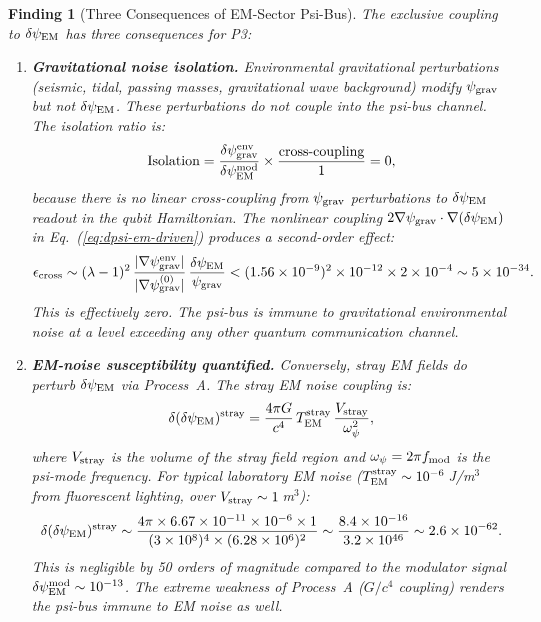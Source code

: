 \documentclass[11pt]{article}
\newtheorem{finding}[theorem]{Finding}
\theoremstyle{definition}
\theoremstyle{remark}
\newcommand{\ee}[1]{\times 10^{#1}}
\newcommand{\psigrav}{\psi_{\rm grav}}
\newcommand{\dpsiEM}{\delta\psi_{\rm EM}}
\begin{document}
\begin{finding}[Three Consequences of EM-Sector Psi-Bus]
\label{finding:em-sector-consequences}
The exclusive coupling to $\dpsiEM$ has three consequences for P3:

\begin{enumerate}
  \item \textbf{Gravitational noise isolation.}
    Environmental gravitational perturbations (seismic, tidal, passing
    masses, gravitational wave background) modify $\psigrav$ but not
    $\dpsiEM$.  These perturbations do not couple into the psi-bus
    channel.  The isolation ratio is:
    \begin{equation}
      \text{Isolation} = \frac{\delta\psigrav^{\rm env}}{\dpsiEM^{\rm mod}}
      \times \frac{\text{cross-coupling}}{1} = 0,
      \label{eq:grav-isolation}
    \end{equation}
    because there is no linear cross-coupling from $\psigrav$
    perturbations to $\dpsiEM$ readout in the qubit Hamiltonian.
    The nonlinear coupling $2\nabla\psigrav\cdot\nabla(\dpsiEM)$ in
    Eq.~(\ref{eq:dpsi-em-driven}) produces a second-order effect:
    \begin{equation}
      \epsilon_{\rm cross} \sim (\lambda-1)^2\,
      \frac{|\nabla\psigrav^{\rm env}|}{|\nabla\psigrav^{(0)}|}
      \,\frac{\dpsiEM}{\psigrav}
      < (1.56\ee{-9})^2 \times 10^{-12} \times 2\ee{-4}
      \sim 5\ee{-34}.
    \end{equation}
    This is effectively zero.  The psi-bus is immune to gravitational
    environmental noise at a level exceeding any other quantum
    communication channel.

  \item \textbf{EM-noise susceptibility quantified.}
    Conversely, stray EM fields \emph{do} perturb $\dpsiEM$ via
    Process~A.  The stray EM noise coupling is:
    \begin{equation}
      \delta(\dpsiEM)^{\rm stray} = \frac{4\pi G}{c^4}\,
      T_{\rm EM}^{\rm stray}\,\frac{V_{\rm stray}}{\omega_\psi^2},
    \end{equation}
    where $V_{\rm stray}$ is the volume of the stray field region and
    $\omega_\psi = 2\pi f_{\rm mod}$ is the psi-mode frequency.
    For typical laboratory EM noise ($T_{\rm EM}^{\rm stray}
    \sim 10^{-6}$\,J/m$^3$ from fluorescent lighting, over $V_{\rm stray}
    \sim 1$\,m$^3$):
    \begin{equation}
      \delta(\dpsiEM)^{\rm stray} \sim \frac{4\pi\times 6.67\ee{-11}
      \times 10^{-6}\times 1}{(3\ee{8})^4\times(6.28\ee{6})^2}
      \sim \frac{8.4\ee{-16}}{3.2\ee{46}} \sim 2.6\ee{-62}.
    \end{equation}
    This is negligible by 50 orders of magnitude compared to the
    modulator signal $\dpsiEM^{\rm mod} \sim 10^{-13}$.  The extreme
    weakness of Process~A ($G/c^4$ coupling) renders the psi-bus
    immune to EM noise as well.


\end{enumerate}
\end{finding}
\end{document}
